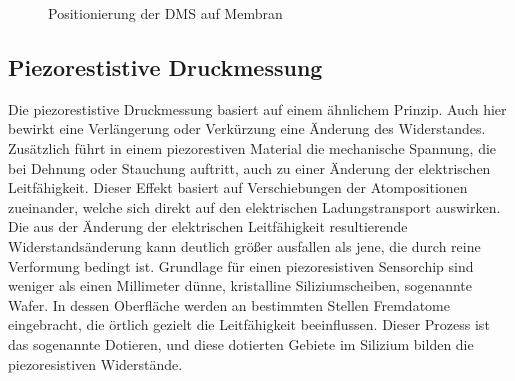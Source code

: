 \begin{figure}[H]	
    \centering
{}
    \caption{Positionierung der DMS auf Membran}
    \label{fig:DMS}
\end{figure}

\subsection{Piezorestistive Druckmessung}

Die piezorestistive Druckmessung basiert auf einem ähnlichem Prinzip. Auch hier bewirkt eine Verlängerung oder Verkürzung eine Änderung des Widerstandes. Zusätzlich führt in einem piezorestiven Material die mechanische Spannung, die bei Dehnung oder Stauchung auftritt, auch zu einer Änderung der elektrischen Leitfähigkeit. Dieser Effekt basiert auf Verschiebungen der Atompositionen zueinander, welche sich direkt auf den elektrischen Ladungstransport auswirken. Die aus der Änderung der elektrischen Leitfähigkeit resultierende Widerstandsänderung kann deutlich größer ausfallen als jene, die durch reine Verformung bedingt ist. Grundlage für einen piezoresistiven Sensorchip sind weniger als einen Millimeter dünne, kristalline Siliziumscheiben, sogenannte Wafer. In dessen Oberfläche werden an bestimmten Stellen Fremdatome eingebracht, die örtlich gezielt die Leitfähigkeit beeinflussen. Dieser Prozess ist das sogenannte Dotieren, und diese dotierten Gebiete im Silizium bilden die piezoresistiven Widerstände. 

